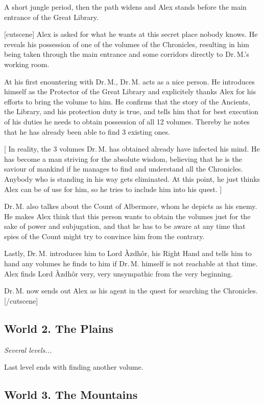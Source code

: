 \documentclass{gd-document}
\newcommand\DrM{Dr.\,M.\xspace}
\newcommand\Azdhor{Lord Àzdhôr\xspace}
\newcommand\level[1]{\textit{#1}}
\begin{document}
A short jungle period, then the path widens and Alex stands before the
main entrance of the Great Library.

[cutscene]
Alex is asked for what he wants at this secret place nobody knows. He
reveals his possession of one of the volumes of the Chronicles,
resulting in him being taken through the main entrance and some
corridors directly to \DrM’s working room.

At his first enountering with \DrM, \DrM acts as a nice person. He
introduces himself as the Protector of the Great Library and
explicitely thanks Alex for his efforts to bring the volume to him. He
confirms that the story of the Ancients, the Library, and his
protection duty is true, and tells him that for best execution of his
duties he needs to obtain possession of all 12 volumes. Thereby he
notes that he has already been able to find 3 existing ones.

[ In reality, the 3 volumes \DrM has obtained already have infected
his mind. He has become a man striving for the absolute wisdom,
believing that he is the saviour of mankind if he manages to find and
understand all the Chronicles. Anybody who is standing in his way gets
eliminated. At this point, he just thinks Alex can be of use for him,
so he tries to include him into his quest. ]

\DrM also talkes about the Count of Albermore, whom he depicts as his
enemy. He makes Alex think that this person wants to obtain the
volumes just for the sake of power and subjugation, and that he has to
be aware at any time that spies of the Count might try to convince him
from the contrary.

Lastly, \DrM introduces him to \Azdhor, his Right Hand and tells him
to hand any volumes he finds to him if \DrM himself is not reachable
at that time. Alex finds \Azdhor very, very unsympathic from the very
beginning.

\DrM now sends out Alex as his agent in the quest for searching the
Chronicles.
[/cutscene]

\subsection{World 2. The Plains}

\level{Several levels...}

Last level ends with finding another volume.

\subsection{World 3. The Mountains}
\end{document}

